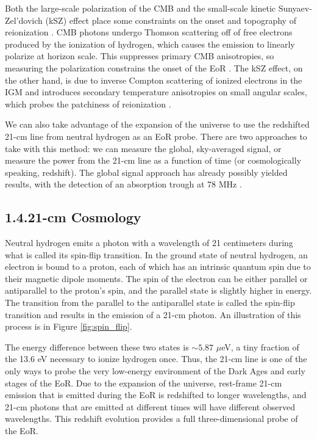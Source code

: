\documentclass[12pt]{article}
\begin{document}
Both the large-scale polarization of the CMB and the small-scale kinetic Sunyaev-Zel'dovich (kSZ) effect place some constraints on the onset and topography of reionization \citep{fan2006}. CMB photons undergo Thomson scattering off of free electrons produced by the ionization of hydrogen, which causes the emission to linearly polarize at horizon scale. This suppresses primary CMB anisotropies, so measuring the polarization constrains the onset of the EoR \citep[e.g.,][]{zaldarriaga1997, roy2018}. The kSZ effect, on the other hand, is due to inverse Compton scattering of ionized electrons in the IGM and introduces secondary temperature anisotropies on small angular scales, which probes the patchiness of reionization \citep{fan2006, park2013, roy2018}.

We can also take advantage of the expansion of the universe to use the redshifted 21-cm line from neutral hydrogen as an EoR probe. There are two approaches to take with this method: we can measure the global, sky-averaged signal, or measure the power from the 21-cm line as a function of time (or cosmologically speaking, redshift). The global signal approach has already possibly yielded results, with the detection of an absorption trough at 78 MHz \citep{bowman2018}. \vspace{3mm}

\tocless\subsection{\hypertarget{subsec:21cm}{1.4.\hspace{0.75em}21-cm Cosmology}}

Neutral hydrogen emits a photon with a wavelength of 21 centimeters during what is called its spin-flip transition. In the ground state of neutral hydrogen, an electron is bound to a proton, each of which has an intrinsic quantum spin due to their magnetic dipole moments. The spin of the electron can be either parallel or antiparallel to the proton's spin, and the parallel state is slightly higher in energy. The transition from the parallel to the antiparallel state is called the spin-flip transition and results in the emission of a 21-cm photon. An illustration of this process is in Figure \ref{fig:spin_flip}.

The energy difference between these two states is $\sim 5.87$ $\mu$eV, a tiny fraction of the 13.6 eV necessary to ionize hydrogen once. Thus, the 21-cm line is one of the only ways to probe the very low-energy environment of the Dark Ages and early stages of the EoR. Due to the expansion of the universe, rest-frame 21-cm emission that is emitted during the EoR is redshifted to longer wavelengths, and 21-cm photons that are emitted at different times will have different observed wavelengths. This redshift evolution provides a full three-dimensional probe of the EoR.
\end{document}
